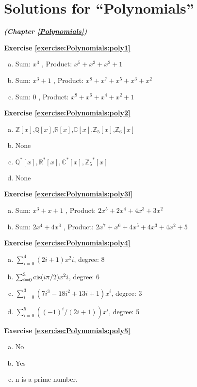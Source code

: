 \section{Solutions for ``Polynomials''}
\label{sec:AnswerKey:Polynomials}
\noindent\textbf{\textit{ (Chapter \ref{Polynomials})}}\bigskip

\noindent\textbf{Exercise \ref{exercise:Polynomials:poly1}}
\begin{enumerate} [(a)]
\item
 Sum: $x^3$ , Product: $x^5+x^3+x^2+1$
\item
 Sum: $x^3+1$ , Product: $x^8+x^7+x^5+x^3+x^2$
\item
 Sum: $0$ , Product: $x^8+x^6+x^4+x^2+1$
\end {enumerate}

\noindent\textbf{Exercise \ref{exercise:Polynomials:poly2}}
\begin{enumerate} [(a)]
\item
 $\mathbb{Z}[x]$,$\mathbb{Q}[x]$,$\mathbb{R}[x]$,$\mathbb{C}[x]$,$\mathbb{Z}_5[x]$,$\mathbb{Z}_6[x]$
\item
 None
\item
 $\mathbb{Q}^*[x],\mathbb{R}^*[x], \mathbb{C}^*[x], {\mathbb{Z}_5}^*[x]$
\item
 None
\end {enumerate}

\noindent\textbf{Exercise \ref{exercise:Polynomials:poly3l}}
\begin{enumerate} [(a)]
\item
 Sum: $x^3+x+1$ , Product: $2x^5+2x^4+4x^3+3x^2$
\item
 Sum: $2x^4+4x^3$ , Product: $2x^7+x^6+4x^5+4x^3+4x^2+5$
\end {enumerate}

\noindent\textbf{Exercise \ref{exercise:Polynomials:poly4}}
\begin{enumerate} [(a)]
\item
 $\sum_{i=0}^{4} (2i+1)x^2i$, degree: 8
\item
 $\sum_{i=0}^{3} \operatorname{cis}(i\pi/2)x^2i$, degree: 6
\item 
$\sum_{i=0}^{3} (7i^3-18i^2+13i+1)x^i$, degree: 3
\item
 $\sum_{i=0}^{5} ((-1)^i/(2i+1))x^i$, degree: 5
\end {enumerate}

\noindent\textbf{Exercise \ref{exercise:Polynomials:poly5}}
\begin{enumerate} [(a)]
\item
 No
\item 
Yes
\item
 n is a prime number.
\end {enumerate}

